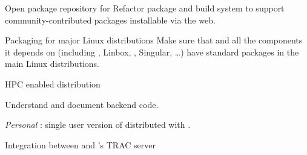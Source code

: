 \begin{workpackage}[id=component-architecture,wphases=0-48!.5,
  title=Component Architecture,lead=UV,
  PSRM=64,UVRM=8,SARM=16, USHRM=4, USORM=6, UBRM=12]
\begin{wpdelivs}
    \begin{wpdeliv}[due=24,id=sage-repository,dissem=PU,nature=OTHER]
      {Open package repository for \Sage} Refactor \Sage package and
      build system to support community-contributed packages
      installable via the web.
    \end{wpdeliv}

    \begin{wpdeliv}[due=48,id=sage-distribution,dissem=PU,nature=OTHER]
      {Packaging for major Linux distributions} Make sure that \Sage and
      all the components it depends on (including \GAP,
      Linbox, \PariGP, Singular, \dots) have standard packages in the
      main Linux distributions.
    \end{wpdeliv}

    \begin{wpdeliv}[due=48,id=hpc-configure,dissem=PU,nature=OTHER]
      {HPC enabled \Sage distribution}
    \end{wpdeliv}

    \begin{wpdeliv}[due=6,id=smc-documentation,dissem=PU,nature=R]
      {Understand and document \SMC backend code.}
    \end{wpdeliv}%

    \begin{wpdeliv}[due=24,id=personal-smc,dissem=PU,nature=OTHER]
      {\emph{Personal} \SMC: single user version of \SMC distributed
        with \Sage.}
    \end{wpdeliv}%

    \begin{wpdeliv}[due=24,id=smc-trac,dissem=PU,nature=OTHER]
      {Integration between \SMC and \Sage's TRAC server}
    \end{wpdeliv}
  \end{wpdelivs}


\end{workpackage}
